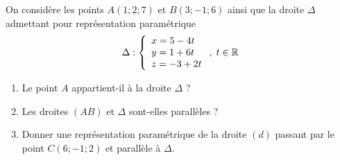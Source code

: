 \documentclass[11pt,fleqn, openany]{book} %
\begin{document}
\begin{exercise}[topic=geo04]On considère les points $A(1;2;7)$ et $B(3;-1;6)$ ainsi que la droite $\Delta$ admettant pour représentation paramétrique \[ \Delta : \left\{\renewcommand{\arraystretch}{1}\begin{array}{l} x = 5 -4t \\ y = 1+6t \\ z = -3+2t 

\end{array}\right. ,\; t\in \mathbb{R}\] 

\begin{enumerate}
\item Le point $A$ appartient-il à la droite $\Delta$ ?
\item Les droites $(AB)$ et $\Delta$ sont-elles parallèles ?
\item Donner une représentation paramétrique de la droite $(d)$ passant par le point $C(6;-1;2)$ et parallèle à $\Delta$.
\end{enumerate}
\end{exercise}
\end{document}
